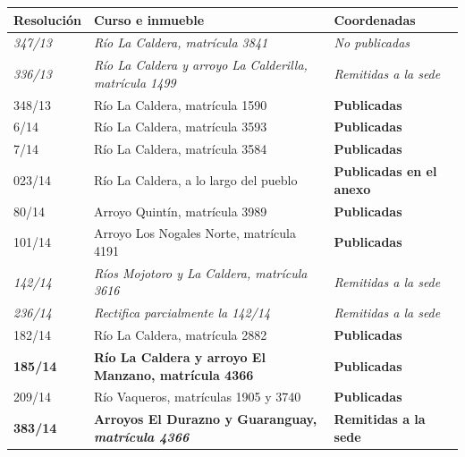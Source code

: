 {\small
\setlength{\LTpre}{0.6em}\setlength{\LTpost}{1.2em}
\begin{longtable}{@{}p{2.1cm}p{6.6cm}p{3.2cm}@{}}
\toprule
\textbf{Resolución} & \textbf{Curso e inmueble} & \textbf{Coordenadas} \\
\midrule
\endhead
\textit{347/13} & \textit{Río La Caldera, matrícula 3841} & \textit{No publicadas} \\
\textit{336/13} & \textit{Río La Caldera y arroyo La Calderilla, matrícula 1499} & \textit{Remitidas a la sede} \\
348/13 & Río La Caldera, matrícula 1590 & \textbf{Publicadas} \\
6/14 & Río La Caldera, matrícula 3593 & \textbf{Publicadas} \\
7/14 & Río La Caldera, matrícula 3584 & \textbf{Publicadas} \\
023/14 & Río La Caldera, a lo largo del pueblo & \textbf{Publicadas en el anexo} \\
80/14 & Arroyo Quintín, matrícula 3989 & \textbf{Publicadas} \\
101/14 & Arroyo Los Nogales Norte, matrícula 4191 & \textbf{Publicadas} \\
\textit{142/14} & \textit{Ríos Mojotoro y La Caldera, matrícula 3616} & \textit{Remitidas a la sede} \\
\textit{236/14} & \textit{Rectifica parcialmente la 142/14} & \textit{Remitidas a la sede} \\
182/14 & Río La Caldera, matrícula 2882 & \textbf{Publicadas} \\
\textbf{185/14} & \textbf{Río La Caldera y arroyo El Manzano, matrícula 4366} & \textbf{Publicadas} \\
209/14 & Río Vaqueros, matrículas 1905 y 3740 & \textbf{Publicadas} \\
\midrule
\textbf{383/14} & \textbf{Arroyos El Durazno y Guaranguay, \textit{matrícula 4366}} & \textbf{Remitidas a la sede} \\
\bottomrule
\end{longtable}
}

